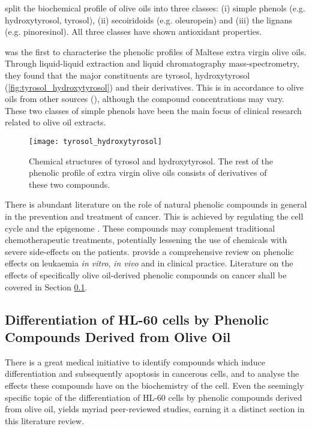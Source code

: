 \cite{owen2000} split the biochemical profile of olive oils into three classes: (i) simple phenols (e.g. hydroxytyrosol, tyrosol), (ii) secoiridoids (e.g. oleuropein) and (iii) the lignans (e.g. pinoresinol). All three classes have shown antioxidant properties.

\cite{gatt2021first} was the first to characterise the phenolic profiles of Maltese extra virgin olive oils. Through liquid-liquid extraction and liquid chromatography mass-spectrometry, they found that the major constituents are tyrosol, hydroxytyrosol (\autoref{fig:tyrosol_hydroxytyrosol}) and their derivatives. This is in accordance to olive oils from other sources (\citep{Angerosa1995}), although the compound concentrations may vary. These two classes of simple phenols have been the main focus of clinical research related to olive oil extracts.

\begin{figure}[!h]
    \centering
    \texttt{[image: tyrosol\_hydroxytyrosol]}
    \caption[Chemical structures of tyrosol and hydroxytyrosol]{Chemical structures of tyrosol and hydroxytyrosol. The rest of the phenolic profile of extra virgin olive oils consists of derivatives of these two compounds.} 
    \label{fig:tyrosol_hydroxytyrosol}
\end{figure}


There is abundant literature on the role of natural phenolic compounds in general in the prevention and treatment of cancer. This is achieved by regulating the cell cycle \citep{jafari2014role} and the epigenome \citep{pan2015breast}. These compounds may complement traditional chemotherapeutic treatments, potentially lessening the use of chemicals with severe side-effects on the patients. \cite{gatt2021phenolic} provide a comprehensive review on phenolic effects on leukaemia \textit{in vitro}, \textit{in vivo} and in clinical practice. Literature on the effects of specifically olive oil-derived phenolic compounds on cancer shall be covered in Section \ref{Differentiation_AML}.

\subsection{Differentiation of HL-60 cells by Phenolic Compounds Derived from Olive Oil}
\label{Differentiation_AML}
There is a great medical initiative to identify compounds which induce differentiation and subsequently apoptosis in cancerous cells, and to analyse the effects these compounds have on the biochemistry of the cell. Even the seemingly specific topic of the differentiation of HL-60 cells by phenolic compounds derived from olive oil, yields myriad peer-reviewed studies, earning it a distinct section in this literature review. 

